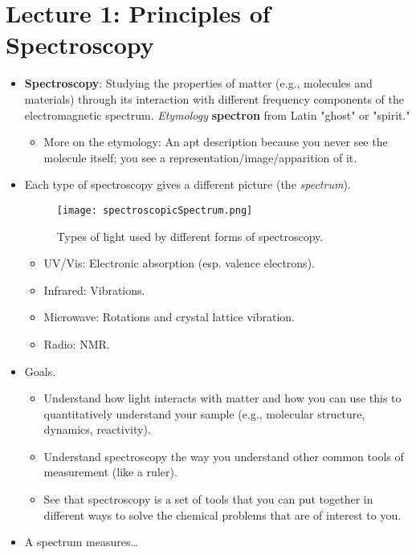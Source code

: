 \documentclass[../notes.tex]{subfiles}
\begin{document}
\section{Lecture 1: Principles of Spectroscopy}
\begin{itemize}
    \item \textbf{Spectroscopy}: Studying the properties of matter (e.g., molecules and materials) through its interaction with different frequency components of the electromagnetic spectrum. \emph{Etymology} \textbf{spectron} from Latin "ghost" or "spirit."
    \begin{itemize}
        \item More on the etymology: An apt description because you never see the molecule itself; you see a representation/image/apparition of it.
    \end{itemize}
    \item Each type of spectroscopy gives a different picture (the \emph{spectrum}).
    \begin{figure}[h!]
        \centering
        \texttt{[image: spectroscopicSpectrum.png]}
        \caption{Types of light used by different forms of spectroscopy.}
        \label{fig:spectroscopicSpectrum}
    \end{figure}
    \begin{itemize}
        \item UV/Vis: Electronic absorption (esp. valence electrons).
        \item Infrared: Vibrations.
        \item Microwave: Rotations and crystal lattice vibration.
        \item Radio: NMR.
    \end{itemize}
    \item Goals.
    \begin{itemize}
        \item Understand how light interacts with matter and how you can use this to quantitatively understand your sample (e.g., molecular structure, dynamics, reactivity).
        \item Understand spectroscopy the way you understand other common tools of measurement (like a ruler).
        \item See that spectroscopy is a set of tools that you can put together in different ways to solve the chemical problems that are of interest to you.
    \end{itemize}
    \item A spectrum measures\dots

\end{itemize}
\end{document}
